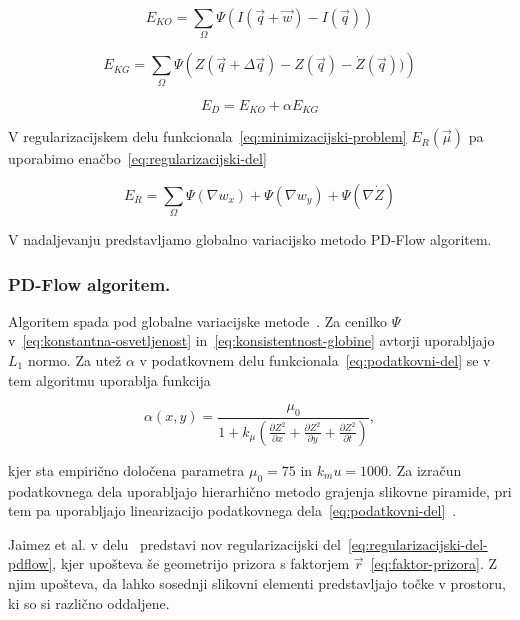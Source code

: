 \begin{equation}\label{eq:konstantna-osvetljenost}
	E_{KO} = \sum_\Omega \Psi( I(\vec{q} + \vec{w}) - I(\vec{q}))
\end{equation}

\begin{equation}\label{eq:konsistentnost-globine}
	E_{KG} = \sum_\Omega \Psi\left( Z(\vec{q} + \Delta \vec{q}) - Z(\vec{q}) - \dot{Z}(\vec{q}))\right)
\end{equation}

\begin{equation}\label{eq:podatkovni-del}
	E_D = E_{KO} + \alpha E_{KG}
\end{equation}

V regularizacijskem delu funkcionala~\eqref{eq:minimizacijski-problem} $E_R(\vec{\mu})$ pa uporabimo enačbo~\eqref{eq:regularizacijski-del}

\begin{equation}\label{eq:regularizacijski-del}
	E_R = \sum_\Omega \Psi\left( \nabla w_x \right) + \Psi\left( \nabla w_y \right) + \Psi\left( \nabla \dot{Z} \right)
\end{equation}

V nadaljevanju predstavljamo globalno variacijsko metodo PD-Flow algoritem.


\subsubsection{PD-Flow algoritem.}\label{sec:pd-flow}
Algoritem spada pod globalne variacijske metode~\cite{jaimez2015primal}. Za cenilko $\Psi$ v~\eqref{eq:konstantna-osvetljenost} in~\eqref{eq:konsistentnost-globine} avtorji uporabljajo $L_1$ normo. Za utež $\alpha$ v podatkovnem delu funkcionala~\eqref{eq:podatkovni-del} se v tem algoritmu uporablja funkcija 

\begin{equation}\label{eq:utez}
 \alpha(x,y) = \frac{\mu_0}{1 + k_\mu \left( \frac{\partial Z^2}{\partial x} + \frac{\partial Z^2}{\partial y} + \frac{\partial Z^2}{\partial t} \right)},
\end{equation}

kjer sta empirično določena parametra $\mu_0 = 75$ in $k_mu = 1000$. Za izračun podatkovnega dela uporabljajo hierarhično metodo grajenja slikovne piramide, pri tem pa uporabljajo linearizacijo podatkovnega dela~\eqref{eq:podatkovni-del}~\cite{jaimez2015primal}.

Jaimez et al. v delu~\cite{jaimez2015primal} predstavi nov regularizacijski del~\eqref{eq:regularizacijski-del-pdflow}, kjer upošteva še geometrijo prizora s faktorjem $\vec{r}$~\eqref{eq:faktor-prizora}. Z njim upošteva, da lahko sosednji slikovni elementi predstavljajo točke v prostoru, ki so si različno oddaljene.

